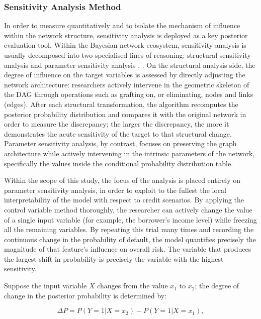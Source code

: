 \subsubsection{Sensitivity Analysis Method}
\label{sec: 3.3.3}
\noindent
In order to measure quantitatively and to isolate the mechanism of influence within the network structure, sensitivity analysis is deployed as a key posterior evaluation tool. Within the Bayesian network ecosystem, sensitivity analysis is usually decomposed into two specialised lines of reasoning: structural sensitivity analysis and parameter sensitivity analysis \cite{kamal2021sensitivity}, \cite{rohmer2020sensitivity}. On the structural analysis side, the degree of influence on the target variables is assessed by directly adjusting the network architecture: researchers actively intervene in the geometric skeleton of the DAG through operations such as grafting on, or eliminating, nodes and links (edges). After each structural transformation, the algorithm recomputes the posterior probability distribution and compares it with the original network in order to measure the discrepancy; the larger the discrepancy, the more it demonstrates the acute sensitivity of the target to that structural change. Parameter sensitivity analysis, by contrast, focuses on preserving the graph architecture while actively intervening in the intrinsic parameters of the network, specifically the values inside the conditional probability distribution table.

Within the scope of this study, the focus of the analysis is placed entirely on parameter sensitivity analysis, in order to exploit to the fullest the local interpretability of the model with respect to credit scenarios. By applying the control variable method thoroughly, the researcher can actively change the value of a single input variable (for example, the borrower's income level) while freezing all the remaining variables. By repeating this trial many times and recording the continuous change in the probability of default, the model quantifies precisely the magnitude of that feature's influence on overall risk. The variable that produces the largest shift in probability is precisely the variable with the highest sensitivity. 

\vspace{1em}
Suppose the input variable $X$ changes from the value $x_1$ to $x_2$; the degree of change in the posterior probability is determined by:

\begin{equation}
    \Delta P=P(Y=1|X=x_2)-P(Y=1|X=x_1),
\end{equation}

